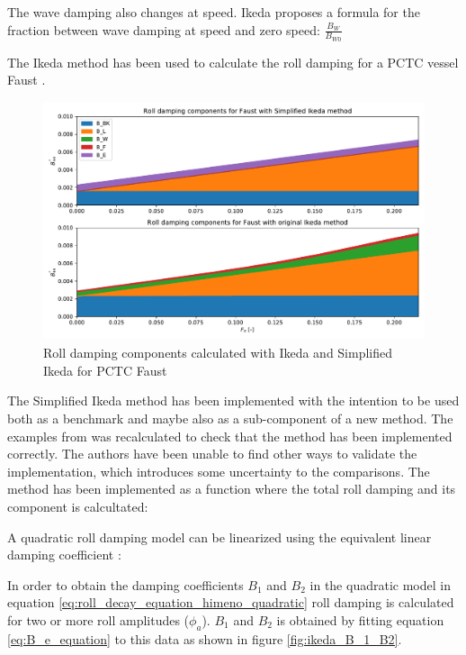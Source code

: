 The wave damping also changes at speed. Ikeda \parencite{ikeda_components_1978} proposes a formula for the fraction between wave damping at speed and zero speed: $\frac{B_W}{B_{W0}}$

The Ikeda method has been used to calculate the roll damping for a PCTC vessel Faust \parencite{soder_assessment_2019}.







\begin{figure}[h]
    \centering
    \includegraphics[height=7cm, width=14cm]{figures/ikeda_vs_simplified.pdf}
    \caption{Roll damping components calculated with Ikeda and Simplified Ikeda for PCTC Faust}
    \label{fig:ikeda_vs_simplified}
\end{figure}

The Simplified Ikeda method \cite{kawahara_simple_2011} has been implemented \cite{alexandersson_martinlarsalbertrolldecay-estimators_2020} with the intention to be used both as a benchmark and maybe also as a sub-component of a new method. The examples from \cite{kawahara_simple_2011} was recalculated to check that the method has been implemented correctly. The authors have been unable to find other ways to validate the implementation, which introduces some uncertainty to the comparisons. The method has been implemented as a function where the total roll damping and its component is calcultated: 


A quadratic roll damping model can be linearized using the equivalent linear damping coefficient \cite{himeno_prediction_1981}:

In order to obtain the damping coefficients $B_1$ and $B_2$ in the quadratic model in equation \ref{eq:roll_decay_equation_himeno_quadratic} roll damping is calculated for two or more roll amplitudes ($\phi_a$). $B_1$ and $B_2$ is obtained by fitting equation \ref{eq:B_e_equation} to this data as shown in figure \ref{fig:ikeda_B_1_B2}.  

